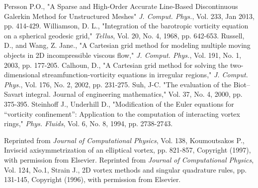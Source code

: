 \documentclass[]{aiaa-tc}%
\begin{document}
\begin{thebibliography}{9}
Persson P.O., "A Sparse and High-Order Accurate Line-Based Discontinuous Galerkin Method for Unstructured Meshes" \textit{J. Comput. Phys.}, Vol. 233, Jan 2013, pp. 414-429.
Williamson, D. L., "Integration of the barotropic vorticity equation on a spherical geodesic grid," \textit{Tellus}, Vol. 20, No. 4, 1968, pp. 642-653.
Russell, D., and Wang, Z. Jane., "A Cartesian grid method for modeling multiple moving objects in 2D incompressible viscous flow," \textit{J. Comput. Phys.}, Vol. 191, No. 1, 2003, pp. 177-205.
Calhoun, D., "A Cartesian grid method for solving the two-dimensional streamfunction-vorticity equations in irregular regions," \textit{J. Comput. Phys.}, Vol. 176, No. 2, 2002, pp. 231-275.
Suh, J-C. "The evaluation of the Biot–Savart integral. Journal of engineering mathematics," Vol. 37, No. 4, 2000, pp. 375-395.
Steinhoff J., Underhill D., "Modification of the Euler equations for ``vorticity confinement'': Application to the computation of interacting vortex rings," \textit{Phys. Fluids}, Vol. 6, No. 8, 1994, pp. 2738-2743.

Reprinted from \textit{Journal of Computational Physics}, Vol. 138, Koumoutsakos P., Inviscid axisymmetrization of an elliptical vortex, pp. 821-857, Copyright (1997), with permission from Elsevier.
Reprinted from \textit{Journal of Computational Physics}, Vol. 124, No.1, Strain J., 2D vortex methods and singular quadrature rules, pp. 131-145, Copyright (1996), with permission from Elsevier.
\end{thebibliography}
\end{document}
